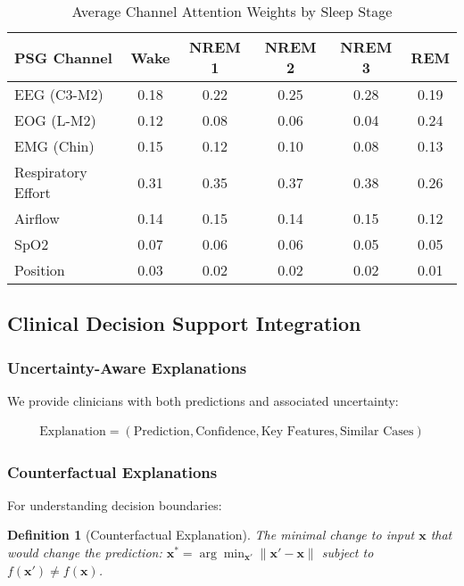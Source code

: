 \documentclass[11pt]{article}
\newtheorem{definition}{Definition}
\begin{document}
\begin{table}[h]
\centering
\caption{Average Channel Attention Weights by Sleep Stage}
\label{tab:channel_attention}
\begin{tabular}{|l|c|c|c|c|c|}
\hline
\textbf{PSG Channel} & \textbf{Wake} & \textbf{NREM 1} & \textbf{NREM 2} & \textbf{NREM 3} & \textbf{REM} \\
\hline
\hline
EEG (C3-M2) & 0.18 & 0.22 & 0.25 & 0.28 & 0.19 \\
\hline
EOG (L-M2) & 0.12 & 0.08 & 0.06 & 0.04 & 0.24 \\
\hline
EMG (Chin) & 0.15 & 0.12 & 0.10 & 0.08 & 0.13 \\
\hline
Respiratory Effort & 0.31 & 0.35 & 0.37 & 0.38 & 0.26 \\
\hline
Airflow & 0.14 & 0.15 & 0.14 & 0.15 & 0.12 \\
\hline
SpO2 & 0.07 & 0.06 & 0.06 & 0.05 & 0.05 \\
\hline
Position & 0.03 & 0.02 & 0.02 & 0.02 & 0.01 \\
\hline
\end{tabular}
\end{table}

\subsection{Clinical Decision Support Integration}

\subsubsection{Uncertainty-Aware Explanations}
We provide clinicians with both predictions and associated uncertainty:

\begin{align}
\text{Explanation} = (\text{Prediction}, \text{Confidence}, \text{Key Features}, \text{Similar Cases})
\end{align}

\subsubsection{Counterfactual Explanations}
For understanding decision boundaries:

\begin{definition}[Counterfactual Explanation]
The minimal change to input $\mathbf{x}$ that would change the prediction: $\mathbf{x}^* = \arg\min_{\mathbf{x}'} \|\mathbf{x}' - \mathbf{x}\|$ subject to $f(\mathbf{x}') \neq f(\mathbf{x})$.
\end{definition}
\end{document}

